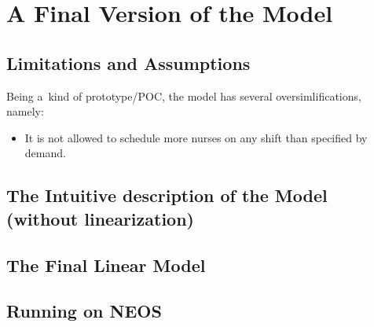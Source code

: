 \section{A Final Version of the Model}

\subsection{Limitations and Assumptions}

Being a~kind of prototype/POC, the model has several oversimlifications, namely:

\begin{itemize}
    \item It is not allowed to schedule more nurses on any shift than specified by demand.
\end{itemize}

\subsection{The Intuitive description of the Model (without linearization)}

\subsection{The Final Linear Model}

\subsection{Running on NEOS}
